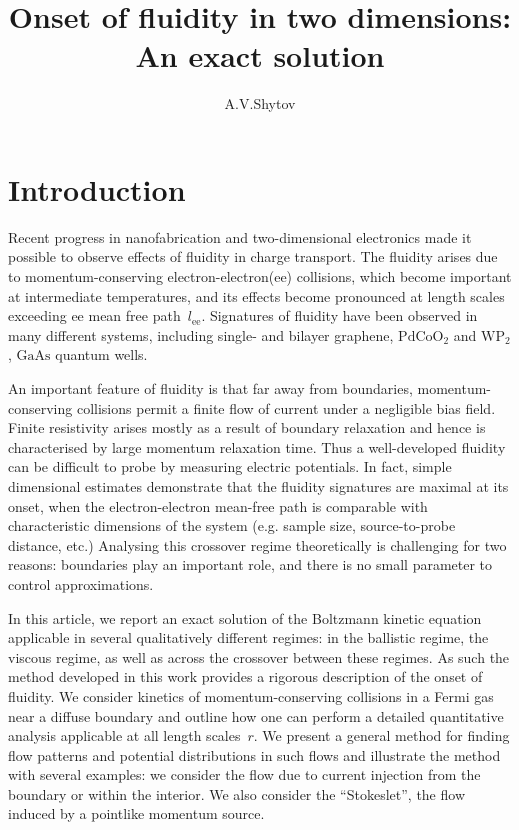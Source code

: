 \documentclass[preprint,aps,eqsecnum, prb]{revtex4-1}
\begin{document}
\title{Onset of fluidity in two dimensions: An exact solution}
\author{A.V.Shytov}
\maketitle

\section{Introduction}
\label{sec:intro}

Recent progress in nanofabrication and two-dimensional electronics
made it possible to observe effects of fluidity in charge transport.
The fluidity arises due to momentum-conserving electron-electron(ee)
collisions, which become important at intermediate temperatures,
and its effects become pronounced at length scales exceeding
ee mean free path~$l_\mathrm{ee}$. Signatures of fluidity
have been observed in many different systems, including
single- and bilayer graphene, $\mathrm{PdCoO}_2$ and $\mathrm{WP}_2$,
$\mathrm{GaAs}$ quantum wells.

An important feature of fluidity is that
far away from boundaries, momentum-conserving
collisions permit a finite flow of current under a negligible bias field.
Finite resistivity arises mostly as a result of boundary relaxation
and hence is characterised by large momentum relaxation time. Thus
a well-developed fluidity can be difficult to probe by measuring electric
potentials. In fact, simple dimensional estimates demonstrate that the
fluidity signatures are maximal at its onset,
when the electron-electron mean-free path is comparable with characteristic
dimensions of the system (e.g. sample size, source-to-probe distance, etc.)
Analysing this crossover regime theoretically
is challenging for two reasons: boundaries play an important role, and
there is no small parameter to control approximations.

In this article, we report an exact solution of the Boltzmann kinetic
equation applicable in several qualitatively different regimes:
in the ballistic regime, the viscous regime, as well as across
the crossover between these regimes. As such the method developed
in this work provides a rigorous description of the onset of fluidity.
We consider kinetics of momentum-conserving collisions in a Fermi
gas near a diffuse boundary and outline how one can perform
a detailed quantitative analysis applicable at all length scales~$r$.
We present a general method for finding flow patterns and potential
distributions in such flows and illustrate the method with several examples:
we consider the flow due to current injection from the boundary or within
the interior.  We also consider the ``Stokeslet'',  the flow
induced by a pointlike momentum source.
\end{document}
